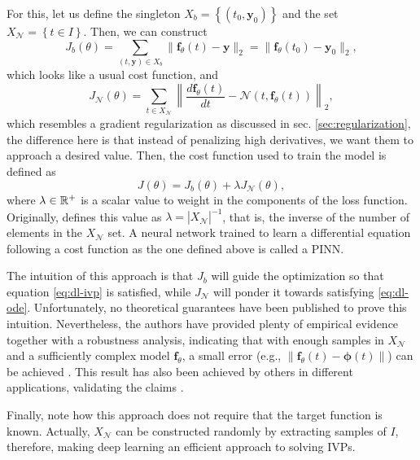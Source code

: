 For this, let us define the singleton $X_b=\left\{ \left( t_0,\bm{y}_0 \right)  \right\} $ and the set $X_{\mathcal{N}}=\left\{ t\in I \right\} $. Then, we can construct \[
    J_b\left( \theta \right) = \sum_{\left( t,\bm{y} \right) \in X_b } \|\bm{f}_\theta(t) - \bm{y}\|_2 = \|\bm{f}_\theta\left( t_0 \right) -\bm{y}_0\|_2
,\] which looks like a usual cost function, and \[
J_{\mathcal{N}}\left( \theta \right) = \sum_{t \in X_{\mathcal{N}}} \left\| \frac{d \bm{f}_\theta\left( t \right) }{dt} - \mathcal{N}\left( t,\bm{f}_\theta\left( t \right)  \right)  \right\|_2
,\] which resembles a gradient regularization as discussed in sec. \ref{sec:regularization}, the difference here is that instead of penalizing high derivatives, we want them to approach a desired value.
Then, the cost function used to train the model is defined as \[
J\left( \theta \right) = J_b\left( \theta \right) + \lambda J_{\mathcal{N}}\left( \theta \right) 
,\] where $\lambda \in \mathbb{R}^+$ is a scalar value to weight in the components of the loss function.
Originally, \textcite{Raissi2019} defines this value as $\lambda = |X_{\mathcal{N}}|^{-1}$, that is, the inverse of the number of elements in the $X_{\mathcal{N}}$ set\footnotemark.
A neural network trained to learn a differential equation following a cost function as the one defined above is called a \gls{PINN}.

The intuition of this approach is that $J_b$ will guide the optimization so that equation \eqref{eq:dl-ivp} is satisfied, while  $J_{\mathcal{N}}$ will ponder it towards satisfying \eqref{eq:dl-ode}.
Unfortunately, no theoretical guarantees have been published to prove this intuition.
Nevertheless, the authors have provided plenty of empirical evidence together with a robustness analysis, indicating that with enough samples in $X_{\mathcal{N}}$ and a sufficiently complex model $\bm{f}_\theta$, a small error (e.g., $\|\bm{f}_\theta\left( t \right)-\bm{\phi}\left( t \right) \| $) can be achieved \cite{Raissi2019}.
This result has also been achieved by others in different applications, validating the claims \cite{noakoasteen_physics-informed_2020,zhang_physics-informed_2020,Arnold2021,Yucesan2022}.

Finally, note how this approach does not require that the target function is known.
Actually, $X_{\mathcal{N}}$ can be constructed randomly by extracting samples of $I$,
therefore, making deep learning an efficient approach to solving \gls{IVP}s.

